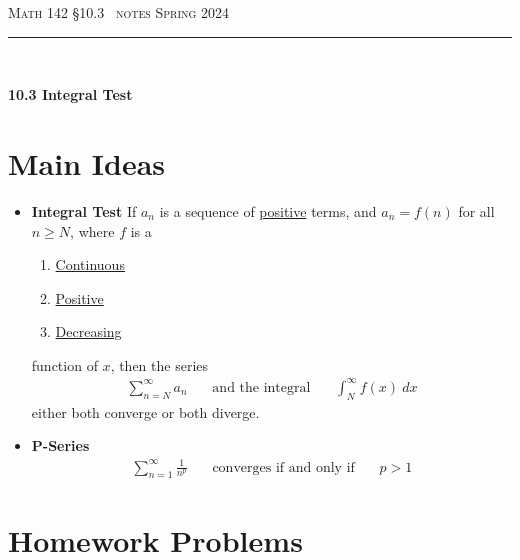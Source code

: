 \documentclass{article}
\def\chapt{10.3}
\begin{document}
\noindent
{\scshape Math 142} \hfill {\scshape \S\chapt~ notes} \hfill {\scshape Spring 2024}

\smallskip

\hrule

\bigskip

\hfill
\\

\thispagestyle{empty}

{
\huge
\noindent
\textbf{10.3 Integral Test}
}

\section*{Main Ideas}

\begin{itemize}
\item
\textbf{Integral Test}
If $a_n$ is a sequence of \underline{positive} terms,
and $a_n=f(n)$ for all $n\geq N$, where $f$ is a
\begin{enumerate}
\item
\underline{Continuous}
\item
\underline{Positive}
\item
\underline{Decreasing}
\end{enumerate}
function of $x$, then the series
\begin{gather*}
\sum_{n=N}^{\infty} a_n
~~~~~~~~\text{and the integral}~~~~~~~~
\int_N^{\infty}f(x)~dx
\end{gather*}
either both converge or both diverge.
\\

\item
\textbf{P-Series}
\\
\begin{gather*}
\sum_{n=1}^{\infty} \frac{1}{n^{p}}
~~~~~~~~\text{converges if and only if}~~~~~~~~
p>1
\end{gather*}

\end{itemize}

\newpage

%
%
%
%

\section*{Homework Problems}
\end{document}
